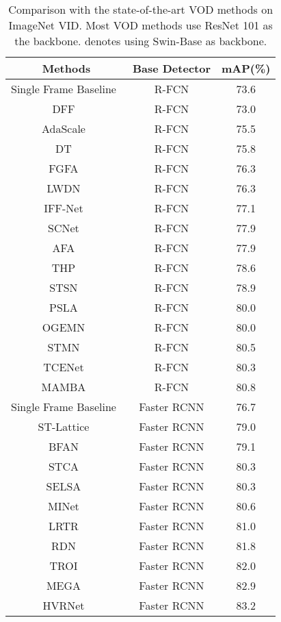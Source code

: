 \documentclass[10pt,journal,compsoc]{IEEEtran}
\begin{document}
\begin{table}[t!]
\caption{Comparison with the state-of-the-art VOD methods on ImageNet VID. Most VOD methods use ResNet 101 as the backbone.  denotes using Swin-Base as backbone.}
\footnotesize
\vspace{-3mm}
\begin{center}
\begin{tabular}{c|c|c}
\toprule
Methods & Base Detector &  mAP(\%) \\
\midrule
Single Frame Baseline~\cite{dai2016r}  & R-FCN & 73.6 \\ DFF~\cite{zhu17dff}  & R-FCN &73.0\\                AdaScale~\cite{feichtenhofer17dt}  & R-FCN &75.5 \\  DT~\cite{chin2019adascale}  & R-FCN &75.8 \\  FGFA~\cite{zhu17fgfa}& R-FCN &76.3\\             LWDN~\cite{jiang2019video} & R-FCN &76.3\\
IFF-Net~\cite{jin2022feature} & R-FCN &77.1\\
SCNet~\cite{wang2020scnet} & R-FCN &77.9\\
AFA~\cite{qian2020adaptive} & R-FCN &77.9\\
THP~\cite{zhu18hp} & R-FCN &78.6\\           STSN~\cite{bertasius18stsn}  & R-FCN  &78.9\\   PSLA~\cite{guo2019progressive}  & R-FCN  & 80.0 \\OGEMN~\cite{deng2019ogemn}  & R-FCN  & 80.0 \\ STMN~\cite{xiao18stmn}  & R-FCN  & 80.5 \\ TCENet~\cite{he2020temporal}  & R-FCN  & 80.3 \\
MAMBA~\cite{sun2021mamba}  & R-FCN  & 80.8 \\
\midrule
Single Frame Baseline~\cite{ren2016faster} & Faster RCNN & 76.7 \\ST-Lattice~\cite{chen2018optimizing} &  Faster RCNN &79.0\\BFAN~\cite{wu2020bfan} &  Faster RCNN &79.1\\STCA~\cite{luo2019object}   &  Faster RCNN & 80.3 \\
SELSA~\cite{wu19selsa}& Faster RCNN & 80.3\\MINet~\cite{MINet}& Faster RCNN & 80.6\\
LRTR~\cite{shvets19lltr} & Faster RCNN  & 81.0 \\RDN~\cite{deng19rdn}   & Faster RCNN & 81.8\\TROI~\cite{gong2021temporal}   & Faster RCNN & 82.0\\MEGA~\cite{chen2020memory} & Faster RCNN  & 82.9\\HVRNet~\cite{han2020mining} & Faster RCNN  & 83.2\\

\end{tabular}
\end{center}
\end{table}
\end{document}
